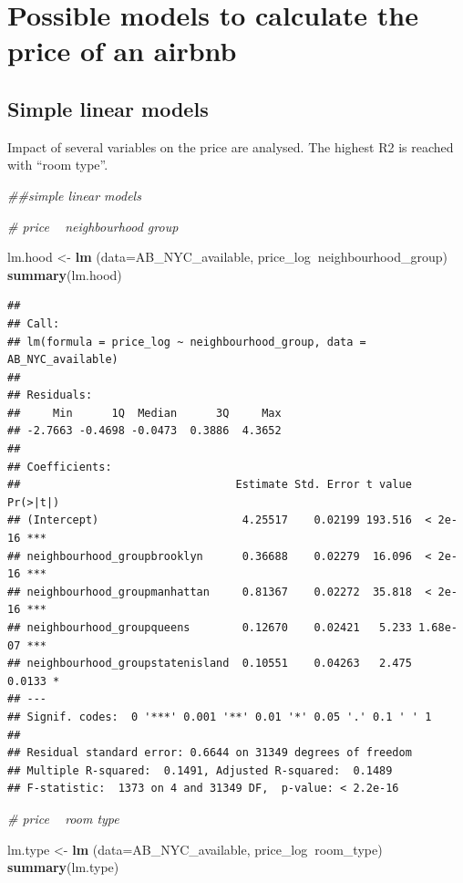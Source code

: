 \documentclass[]{article}
\newenvironment{Shaded}{\begin{snugshade}}{\end{snugshade}}
\newcommand{\CommentTok}[1]{\textcolor[rgb]{0.56,0.35,0.01}{\textit{#1}}}
\newcommand{\DataTypeTok}[1]{\textcolor[rgb]{0.13,0.29,0.53}{#1}}
\newcommand{\KeywordTok}[1]{\textcolor[rgb]{0.13,0.29,0.53}{\textbf{#1}}}
\newcommand{\NormalTok}[1]{#1}
\newcommand{\OperatorTok}[1]{\textcolor[rgb]{0.81,0.36,0.00}{\textbf{#1}}}
\newcommand{\StringTok}[1]{\textcolor[rgb]{0.31,0.60,0.02}{#1}}
\begin{document}
\hypertarget{possible-models-to-calculate-the-price-of-an-airbnb}{%
\section{Possible models to calculate the price of an
airbnb}\label{possible-models-to-calculate-the-price-of-an-airbnb}}

\hypertarget{simple-linear-models}{%
\subsection{Simple linear models}\label{simple-linear-models}}

Impact of several variables on the price are analysed. The highest R2 is
reached with ``room type''.

\begin{Shaded}
\begin{Highlighting}[]
\CommentTok{##simple linear models}

\CommentTok{# price ~ neighbourhood group}

\NormalTok{lm.hood <-}\StringTok{ }\KeywordTok{lm}\NormalTok{ (}\DataTypeTok{data=}\NormalTok{AB_NYC_available, price_log}\OperatorTok{~}\NormalTok{neighbourhood_group)}
\KeywordTok{summary}\NormalTok{(lm.hood)}
\end{Highlighting}
\end{Shaded}

\begin{verbatim}
## 
## Call:
## lm(formula = price_log ~ neighbourhood_group, data = AB_NYC_available)
## 
## Residuals:
##     Min      1Q  Median      3Q     Max 
## -2.7663 -0.4698 -0.0473  0.3886  4.3652 
## 
## Coefficients:
##                                 Estimate Std. Error t value Pr(>|t|)    
## (Intercept)                      4.25517    0.02199 193.516  < 2e-16 ***
## neighbourhood_groupbrooklyn      0.36688    0.02279  16.096  < 2e-16 ***
## neighbourhood_groupmanhattan     0.81367    0.02272  35.818  < 2e-16 ***
## neighbourhood_groupqueens        0.12670    0.02421   5.233 1.68e-07 ***
## neighbourhood_groupstatenisland  0.10551    0.04263   2.475   0.0133 *  
## ---
## Signif. codes:  0 '***' 0.001 '**' 0.01 '*' 0.05 '.' 0.1 ' ' 1
## 
## Residual standard error: 0.6644 on 31349 degrees of freedom
## Multiple R-squared:  0.1491, Adjusted R-squared:  0.1489 
## F-statistic:  1373 on 4 and 31349 DF,  p-value: < 2.2e-16
\end{verbatim}

\begin{Shaded}
\begin{Highlighting}[]
\CommentTok{# price ~ room type}

\NormalTok{lm.type <-}\StringTok{ }\KeywordTok{lm}\NormalTok{ (}\DataTypeTok{data=}\NormalTok{AB_NYC_available, price_log}\OperatorTok{~}\NormalTok{room_type)}
\KeywordTok{summary}\NormalTok{(lm.type)}
\end{Highlighting}
\end{Shaded}
\end{document}
